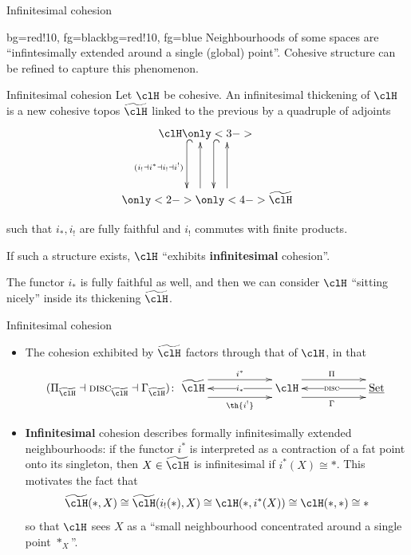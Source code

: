 \documentclass[presentation]{beamer}
\begin{document}
%
%
%
%
%
%
%
\begin{frame}{Infinitesimal cohesion}
	\begin{variableblock}{}{bg=red!10, fg=black}{bg=red!10, fg=blue}
		Neighbourhoods of some spaces are ``infintesimally extended around a single (global) point''. Cohesive structure can be refined to capture this phenomenon.
	\end{variableblock}
\end{frame}
%
%
%
%
%
%
%
\begin{frame}{Infinitesimal cohesion}
	Let $\clH$ be cohesive. An \alert{infinitesimal thickening} of $\clH$ is a new cohesive topos $\thH$ linked to the previous by a quadruple of adjoints
	\[
		\xymatrix@R=1.5cm{
		\clH
		\ar@{^{(}->}@<-18pt>[d]_{(i_! \dashv i^* \dashv i_! \dashv i^!)}
		\only<3->{\ar@{^{(}->}@<6pt>[d]}
		\\
		\ar@[white]@<-18pt>[u]
		\only<2->{\ar@<6pt>[u]}
		\only<4->{\ar@<-18pt>[u]}
		\thH
		}
	\]

	\vspace*{\fill}
	such that $i_*, i_!$ are fully faithful and $i_!$ commutes with finite products.

	If such a structure exists, $\clH$ ``exhibits \textbf{infinitesimal} cohesion''.
	\onslide<6->
	\begin{myblock}{}
		The functor $i_*$ is fully faithful as well, and then we can consider $\clH$ ``sitting nicely'' inside its thickening $\thH$.
	\end{myblock}
\end{frame}
%
%
%
%
%
%
%
\begin{frame}{Infinitesimal cohesion}
	\begin{itemize}
		\item<+-> The cohesion exhibited by $\thH$ \alert{factors through} that of $\clH$, in that
		      \[
			      (\Pi_{\thH} \dashv \disc_{\thH} \dashv \Gamma_{\thH})
			      \colon
			      \xymatrix@C=2cm{
			      \thH \ar@<-8pt>[r]_{\th{i^!}} \ar@{<-}[r]|{i_*} \ar@<8pt>[r]^{i^*} &
			      \clH \ar@<-8pt>[r]_\Gamma \ar@{<-}[r]|{\disc} \ar@<8pt>[r]^\Pi &
			      \Set
			      }
		      \]
		\item<+-> \textbf{Infinitesimal} cohesion describes formally infinitesimally extended neighbourhoods: if the functor $i^*$ is interpreted as a \alert{contraction} of a fat point onto its singleton, then $X\in \thH$ is infinitesimal if $i^*(X)\cong *$. \onslide<+->This motivates the fact that
		      \[
			      \thH(*,X)\cong \thH(i_!(*),X)\cong \clH(*,i^*(X))\cong \clH(*,*)\cong *
		      \]
		      so that $\clH$ sees $X$ as a  ``small neighbourhood concentrated around a single point $*_X$''.
	\end{itemize}
\end{frame}
\end{document}

